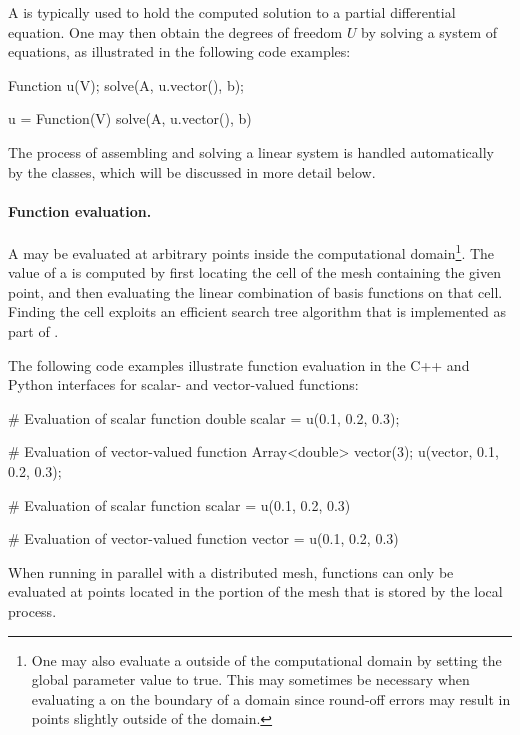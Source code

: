 A  is typically used to hold the computed solution to a
partial differential equation. One may then obtain the degrees of
freedom $U$ by solving a system of equations, as illustrated in the
following code examples:
\begin{c++}
Function u(V);
solve(A, u.vector(), b);
\end{c++}
\begin{python}
u = Function(V)
solve(A, u.vector(), b)
\end{python}
The process of assembling and solving a linear system is handled
automatically by the
classes\break {}, which will be
discussed in more detail below.

\paragraph{Function evaluation.}

A  may be evaluated at arbitrary points inside the
computational domain\footnote{One may also evaluate a 
  outside of the computational domain by setting the global parameter value
   to true. This may sometimes be
  necessary when evaluating a  on the boundary of a
  domain since round-off errors may result in points slightly outside
  of the domain.}. The value of a  is computed by first
locating the cell of the mesh containing the given point, and then
evaluating the linear combination of basis functions on that cell. Finding
the cell exploits an efficient search tree
algorithm that is implemented as part of \citet{www:cgal}.

The following code examples illustrate function evaluation in the C++
and Python interfaces for scalar- and vector-valued functions:
\begin{c++}
# Evaluation of scalar function
double scalar = u(0.1, 0.2, 0.3);

# Evaluation of vector-valued function
Array<double> vector(3);
u(vector, 0.1, 0.2, 0.3);
\end{c++}
\begin{python}
# Evaluation of scalar function
scalar = u(0.1, 0.2, 0.3)

# Evaluation of vector-valued function
vector = u(0.1, 0.2, 0.3)
\end{python}
When running in parallel with a distributed mesh, functions can only be
evaluated at points located in the portion of the mesh that is stored
by the local process.

